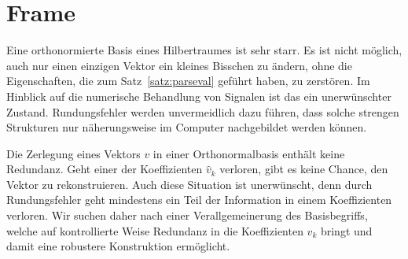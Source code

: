 %
%
%
\section{Frame\label{section:frame}}
%
Eine orthonormierte Basis eines Hilbertraumes ist sehr starr.
Es ist nicht möglich, auch nur einen einzigen Vektor ein kleines
Bisschen zu ändern, ohne die Eigenschaften, die zum Satz~\ref{satz:parseval}
geführt haben, zu zerstören.
Im Hinblick auf die numerische Behandlung von Signalen ist das
ein unerwünschter Zustand.
Rundungsfehler werden unvermeidlich dazu führen, dass solche strengen
Strukturen nur näherungsweise im Computer nachgebildet werden können.

Die Zerlegung eines Vektors $v$ in einer Orthonormalbasis enthält keine
Redundanz.
Geht einer der Koeffizienten $\hat{v}_k$ verloren, gibt es keine
Chance, den Vektor zu rekonstruieren.
Auch diese Situation ist unerwünscht, denn durch Rundungsfehler geht
mindestens ein Teil der Information in einem Koeffizienten verloren.
Wir suchen daher nach einer Verallgemeinerung des Basisbegriffs, welche
auf kontrollierte Weise Redundanz in die Koeffizienten $\hat{v}_k$
bringt und damit eine robustere Konstruktion ermöglicht.

%
%
